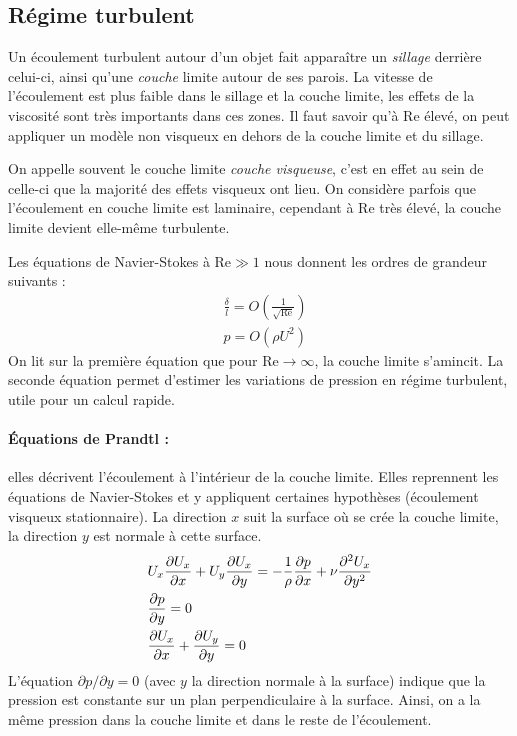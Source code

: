 \subsection{Régime turbulent}
Un écoulement turbulent autour d'un objet fait apparaître un \textit{sillage} derrière celui-ci, ainsi qu'une \textit{couche} limite autour de ses parois. La vitesse de l'écoulement est plus faible dans le sillage et la couche limite, les effets de la viscosité sont très importants dans ces zones. Il faut savoir qu'à $\mathrm{Re}$ élevé, on peut appliquer un modèle non visqueux en dehors de la couche limite et du sillage.

On appelle souvent le couche limite \textit{couche visqueuse}, c'est en effet au sein de celle-ci que la majorité des effets visqueux ont lieu. On considère parfois que l'écoulement en couche limite est laminaire, cependant à $\mathrm{Re}$ très élevé, la couche limite devient elle-même turbulente.

Les équations de Navier-Stokes à $\mathrm{Re} \gg 1$ nous donnent les ordres de grandeur suivants :
%
\begin{align}
    & \frac {\delta}{l} = O \left( \frac{1}{\sqrt{\mathrm{Re}}} \right) \\
    & p = O \left( \rho U^2 \right)
\end{align}
%
On lit sur la première équation que pour $\mathrm{Re} \to \infty$, la couche limite s'amincit. La seconde équation permet d'estimer les variations de pression en régime turbulent, utile pour un calcul rapide.

\paragraph{Équations de Prandtl :}elles décrivent l'écoulement à l'intérieur de la couche limite. Elles reprennent les équations de Navier-Stokes et y appliquent certaines hypothèses (écoulement visqueux stationnaire). La direction $x$ suit la surface où se crée la couche limite, la direction $y$ est normale à cette surface.
%
\begin{align}[left=\empheqlbrace]
    & U_x \frac{ \partial U_x }{ \partial x }
    + U_y \frac{ \partial U_x }{ \partial y }
    = - \frac{1}{\rho} \frac{ \partial p }{ \partial x }
    + \nu \frac{ \partial^2 U_x }{ \partial y^2 } \\
    \notag & \frac{ \partial p }{ \partial y } = 0 \\
    \notag & \frac{ \partial U_x }{ \partial x }
           + \frac{ \partial U_y }{ \partial y } = 0
\end{align}
%
L'équation $\partial p / \partial y = 0$ (avec $y$ la direction normale à la surface) indique que la pression est constante sur un plan perpendiculaire à la surface. Ainsi, on a la même pression dans la couche limite et dans le reste de l'écoulement.


